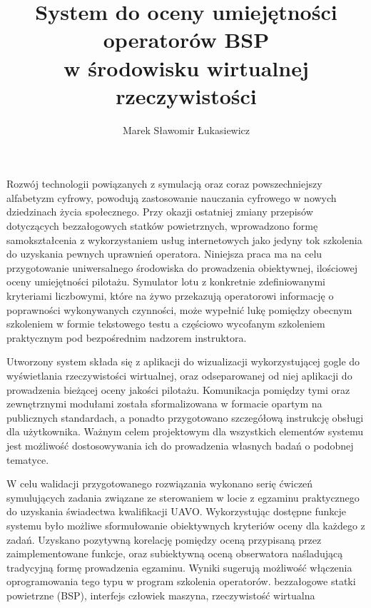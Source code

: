 \documentclass[
    a4paper,
    left=25mm,         %
    right=25mm,        %
    top=25mm,          %
    bottom=25mm,         %
    bindingoffset=5mm,  %
    nohyphenation=false %
]{src/wut-thesis}
\begin{document}
\MasterThesis %
{}
\title{
    System do oceny umiejętności operatorów BSP \\
    w środowisku wirtualnej rzeczywistości
}
\author{Marek Sławomir Łukasiewicz}
\date{\the\year}
\maketitle

\cleardoublepage %
\streszczenie Rozwój technologii powiązanych z symulacją oraz coraz powszechniejszy alfabetyzm cyfrowy, powodują zastosowanie nauczania cyfrowego w nowych dziedzinach życia społecznego. Przy okazji ostatniej zmiany przepisów dotyczących bezzałogowych statków powietrznych, wprowadzono formę samokształcenia z wykorzystaniem usług internetowych jako jedyny tok szkolenia do uzyskania pewnych uprawnień operatora. Niniejsza praca ma na celu przygotowanie uniwersalnego środowiska do prowadzenia obiektywnej, ilościowej oceny umiejętności pilotażu. Symulator lotu z konkretnie zdefiniowanymi kryteriami liczbowymi, które na żywo przekazują operatorowi informację o poprawności wykonywanych czynności, może wypełnić lukę pomiędzy obecnym szkoleniem w formie tekstowego testu a częściowo wycofanym szkoleniem praktycznym pod bezpośrednim nadzorem instruktora.

Utworzony system składa się z aplikacji do wizualizacji wykorzystującej gogle do wyświetlania rzeczywistości wirtualnej, oraz odseparowanej od niej aplikacji do prowadzenia bieżącej oceny jakości pilotażu. Komunikacja pomiędzy tymi oraz zewnętrznymi modułami została sformalizowana w formacie opartym na publicznych standardach, a ponadto przygotowano szczegółową instrukcję obsługi dla użytkownika. Ważnym celem projektowym dla wszystkich elementów systemu jest możliwość dostosowywania ich do prowadzenia własnych badań o podobnej tematyce.

W celu walidacji przygotowanego rozwiązania wykonano serię ćwiczeń symulujących zadania związane ze sterowaniem w locie z egzaminu praktycznego do uzyskania świadectwa kwalifikacji UAVO. Wykorzystując dostępne funkcje systemu było możliwe sformułowanie obiektywnych kryteriów oceny dla każdego z zadań. Uzyskano pozytywną korelację pomiędzy oceną przypisaną przez zaimplementowane funkcje, oraz subiektywną oceną obserwatora naśladującą tradycyjną formę prowadzenia egzaminu. Wyniki sugerują możliwość włączenia oprogramowania tego typu w program szkolenia operatorów.
\slowakluczowe bezzałogowe statki powietrzne (BSP), interfejs człowiek maszyna, rzeczywistość wirtualna
\end{document}
